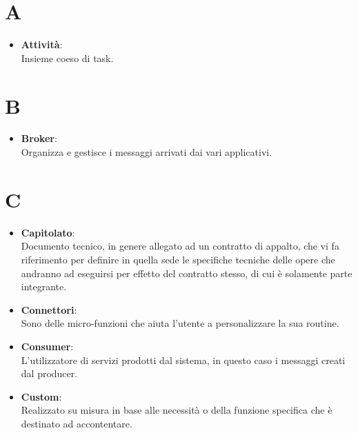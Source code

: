 \documentclass[a4paper, oneside, openany, dvipsnames, table]{article}
\begin{document}
\copertina{}

%
\newpage
\tableofcontents
\newpage

\newpage
\section{A}
\begin{itemize}
\item  \textbf{Attività}:\\	Insieme coeso di task.
\end{itemize}

\newpage
\section{B}
\begin{itemize}
\item \textbf{Broker}:\\	 Organizza e gestisce i messaggi arrivati dai vari applicativi.
\end{itemize}

\newpage
\section{C}
\begin{itemize}
\item \textbf{Capitolato}:\\	Documento tecnico, in genere allegato ad un contratto di appalto, che vi fa riferimento per definire in quella sede le specifiche tecniche delle opere che andranno ad eseguirsi per effetto del contratto stesso, di cui è solamente parte integrante.
\end{itemize}

\begin{itemize}
\item \textbf{Connettori}:\\	Sono delle micro-funzioni che aiuta l'utente a personalizzare la sua routine.
\end{itemize}

\begin{itemize}
\item \textbf{Consumer}:\\	L'utilizzatore di servizi prodotti dal sistema, in questo caso i messaggi creati dal producer.
\end{itemize}

\begin{itemize}
\item \textbf{Custom}:\\	Realizzato su misura in base alle necessità  o della funzione specifica che è destinato ad accontentare.	
\end{itemize}
\end{document}
